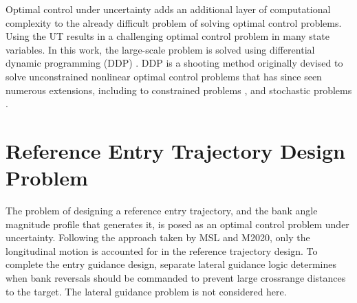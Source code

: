 \documentclass[journal ]{new-aiaa}
\begin{document}
Optimal control under uncertainty adds an additional layer of computational complexity to the already difficult problem of solving optimal control problems. Using the UT results in a challenging optimal control problem in many state variables. In this work, the large-scale problem is solved using differential dynamic programming (DDP) \cite{DDP}. DDP is a shooting method originally devised to solve unconstrained nonlinear optimal control problems that has since seen numerous extensions, including to constrained problems \cite{DDP_ControlLimited,HDDP1,HDDP2,DDP_NonlinearConstraints,DDP_InteriorPoint}, and stochastic problems \cite{iLQG, DDP_Stochastic, ozaki_UT,ozaki2020tube}. 


\section*{Reference Entry Trajectory Design Problem}
The problem of designing a reference entry trajectory, and the bank angle magnitude profile that generates it, is posed as an optimal control problem under uncertainty. Following the approach taken by MSL and M2020, only the longitudinal motion is accounted for in the reference trajectory design. To complete the entry guidance design, separate lateral guidance logic determines when bank reversals should be commanded to prevent large crossrange distances to the target. The lateral guidance problem is not considered here.
\end{document}
